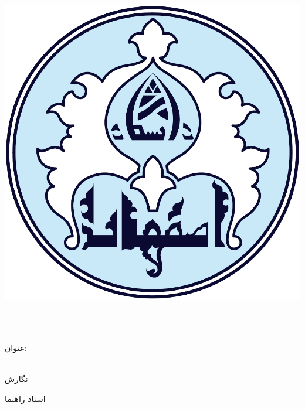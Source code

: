 
\begin{center}

\includegraphics[scale=0.2]{./assets/logo.pdf}

\vspace{0.5cm}
\ThesisUniversity \\[-0.3em]
\vspace{0.5cm}
\ThesisDepartment\\

\begin{large}
\vspace{0.5cm}



\end{large}

\vspace{1.5cm}

{عنوان:}\\[1.2em]
{\LARGE\textbf{\ThesisTitle}}\\ 
\vspace{1cm}

\vspace{2cm}

{نگارش}\\[.5em]
{\large\textbf{\ThesisAuthor}}

\vspace{1.5cm}

{استاد راهنما}\\[.5em]
{\large\textbf{\ThesisSupervisor}}

\vspace{1cm}



\vspace{2cm}

\ThesisDate

\end{center}

\newpage
